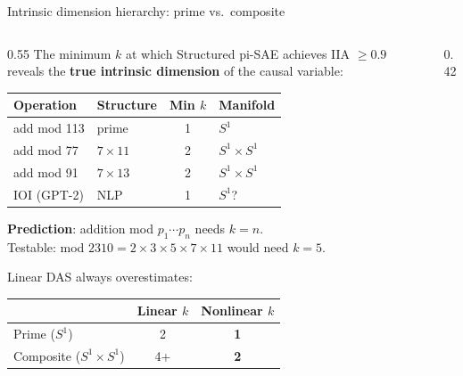 \documentclass[aspectratio=169,11pt]{beamer}
\begin{document}
\begin{frame}{Intrinsic dimension hierarchy: prime vs.\ composite}

\begin{columns}[T]
\begin{column}{0.55\textwidth}
{\small The minimum $k$ at which Structured pi-SAE achieves IIA $\geq 0.9$ reveals the \textbf{true intrinsic dimension} of the causal variable:}

\vspace{0.5em}
\begin{tabular}{@{}llcl@{}}
\toprule
\textbf{Operation} & \textbf{Structure} & \textbf{Min $k$} & \textbf{Manifold} \\
\midrule
add mod 113 & prime & 1 & $S^1$ \\
add mod 77 & $7 \times 11$ & 2 & $S^1 \times S^1$ \\
add mod 91 & $7 \times 13$ & 2 & $S^1 \times S^1$ \\
IOI (GPT-2) & NLP & 1 & $S^1$? \\
\bottomrule
\end{tabular}

\vspace{0.5em}
{\small\textbf{Prediction}: addition mod $p_1 \cdots p_n$ needs $k = n$.\\
Testable: mod $2310 = 2{\times}3{\times}5{\times}7{\times}11$ would need $k{=}5$.}

\vspace{0.5em}
{\small Linear DAS always overestimates:}\\[0.2em]
{\footnotesize
\begin{tabular}{@{}lcc@{}}
& \textbf{Linear $k$} & \textbf{Nonlinear $k$} \\
\midrule
Prime ($S^1$) & 2 & \textbf{1} \\
Composite ($S^1 {\times} S^1$) & 4+ & \textbf{2} \\
\end{tabular}
}
\end{column}
\begin{column}{0.42\textwidth}
\centering

\end{column}
\end{columns}
\end{frame}
\end{document}
